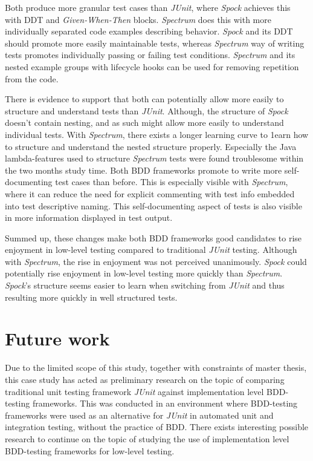Both produce more
granular test cases than \textit{JUnit}, where \textit{Spock} achieves this with DDT and \textit{Given-When-Then} blocks. \textit{Spectrum} does this with more individually separated
code examples describing behavior. \textit{Spock} and its DDT should promote more easily maintainable tests, whereas \textit{Spectrum}
way of writing tests promotes individually passing or failing test conditions. \textit{Spectrum} and
its nested example groups with lifecycle hooks can be used for removing repetition from the code.

There is evidence to support that both can potentially allow more easily to structure and understand tests than \textit{JUnit}. Although, the structure of
\textit{Spock} doesn't contain nesting, and as such might allow more easily to understand individual tests.
With \textit{Spectrum}, there exists a longer learning curve to 1earn how to structure and understand the nested structure
properly. Especially the Java lambda-features used to structure \textit{Spectrum} tests were found troublesome within the two months
study time.
Both BDD frameworks
promote to write more self-documenting test cases than before. This is especially visible with \textit{Spectrum}, where it
can reduce the need for explicit commenting with test info embedded into test descriptive naming. This self-documenting
aspect of tests is also visible in more information displayed in test output.

Summed up, these changes make both BDD frameworks good candidates to rise enjoyment in low-level testing compared to traditional
\textit{JUnit} testing. Although with \textit{Spectrum}, the rise in enjoyment was not perceived unanimously. \textit{Spock} could potentially rise enjoyment in low-level
testing more quickly than \textit{Spectrum}.
\textit{Spock}'s structure seems easier to learn when switching from \textit{JUnit} and thus resulting more quickly in well structured tests.


\section{Future work}
Due to the limited scope of this study, together with constraints of master thesis, this case study has acted as preliminary
research on the topic of comparing traditional unit testing framework \textit{JUnit} against
implementation level BDD-testing frameworks. This was conducted in an environment where BDD-testing frameworks were used
as an alternative for \textit{JUnit} in automated unit and integration testing, without the practice of BDD.
There exists interesting possible research to continue
on the topic of studying the use of implementation level BDD-testing frameworks for low-level testing.

